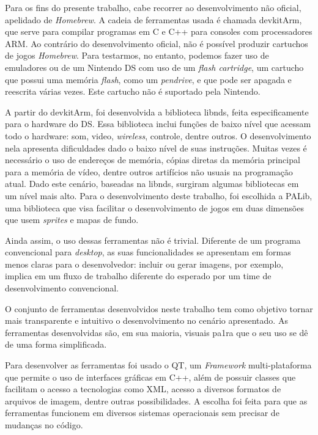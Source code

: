 \documentclass[brazil]{abnt}
\begin{document}
Para os fins do presente trabalho, cabe recorrer ao desenvolvimento não oficial, apelidado de \textit{Homebrew}. A cadeia de ferramentas usada é chamada devkitArm, que serve para compilar programas em C e C++ para consoles com processadores ARM. Ao contrário do desenvolvimento oficial, não é possível produzir cartuchos de jogos \textit{Homebrew}. Para testarmos, no entanto, podemos fazer uso de emuladores ou de um Nintendo DS com uso de um \textit{flash cartridge}, um cartucho que possui uma memória \textit{flash}, como um \textit{pendrive}, e que pode ser apagada e reescrita várias vezes. Este cartucho não é suportado pela Nintendo.

A partir do devkitArm, foi desenvolvida a biblioteca libnds, feita especificamente para o hardware do DS. Essa biblioteca inclui funções de baixo nível que acessam todo o hardware: som, video, \textit{wireless}, controle, dentre outros. O desenvolvimento nela apresenta dificuldades dado o baixo nível de suas instruções. Muitas vezes é necessário o uso de endereços de memória, cópias diretas da memória principal para a memória de vídeo, dentre outros artifícios não usuais na programação atual. Dado este cenário, baseadas na libnds, surgiram algumas bibliotecas em um nível mais alto. Para o desenvolvimento deste trabalho, foi escolhida a PALib, uma biblioteca que visa facilitar o desenvolvimento de jogos em duas dimensões que usem \textit{sprites} e mapas de fundo.

Ainda assim, o uso dessas ferramentas não é trivial. Diferente de um programa convencional para \textit{desktop}, as suas funcionalidades se apresentam em formas menos claras para o desenvolvedor: incluir ou gerar imagens, por exemplo, implica em um fluxo de trabalho diferente do esperado por um time de desenvolvimento convencional. 

O conjunto de ferramentas desenvolvidos neste trabalho tem como objetivo tornar mais transparente e intuitivo o desenvolvimento no cenário apresentado. As ferramentas desenvolvidas são, em sua maioria, visuais pa1ra que o seu uso se dê de uma forma simplificada.


Para desenvolver as ferramentas foi usado o QT, um \textit{Framework} multi-plataforma que permite o uso de interfaces gráficas em C++, além de possuir classes que facilitam o acesso a tecnologias como XML, acesso a diversos formatos de arquivos de imagem, dentre outras possibilidades. A escolha foi feita para que as ferramentas funcionem em diversos sistemas operacionais sem precisar de mudanças no código.
\end{document}

